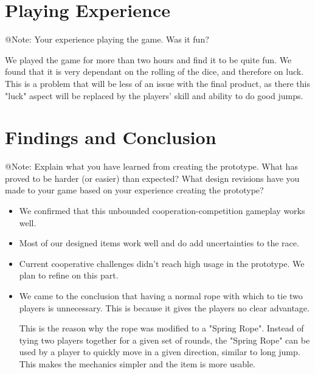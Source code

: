 \FloatBarrier



\section{Playing Experience}

\begin{TempText}
	@Note: Your experience playing the game. Was it fun?
\end{TempText}

We played the game for more than two hours and find it to be quite fun. We found that it is very dependant on the rolling of the dice, and therefore on luck. This is a problem that will be less of an issue with the final product, as there this "luck" aspect will be replaced by the players' skill and ability to do good jumps.


\section{Findings and Conclusion}

\begin{TempText}
	@Note: Explain what you have learned from creating the prototype. What has proved to be harder (or easier) than expected? What design revisions have you made to your game based on your experience creating the prototype?
\end{TempText}

\begin{itemize}
    \item We confirmed that this unbounded cooperation-competition gameplay 
    works well. 
    \item Most of our designed items work well and do add uncertainties to the race.
    \item Current cooperative challenges didn't reach high usage in the prototype. We plan to refine on this part.
    
    \item We came to the conclusion that having a normal rope with which to tie two players is unnecessary. This is because it gives the players no clear advantage.

    This is the reason why the rope was modified to a "Spring Rope". Instead of tying two players together for a given set of rounds, the "Spring Rope" can be used by a player to quickly move in a given direction, similar to long jump. This makes the mechanics simpler and the item is more usable.
\end{itemize}



